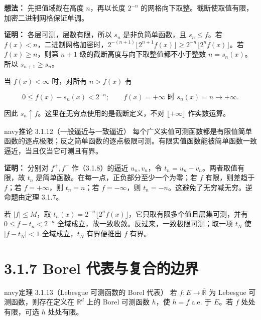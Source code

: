 \documentclass[11pt,a4paper]{article}
\begin{document}
\textbf{想法：} 先把值域截在高度 \(n\)，再以长度 \(2^{-n}\)
的网格向下取整。截断使取值有限，加密二进制网格保证单调。

\textbf{证明：} 各层可测，层数有限，所以 \(s_n\) 是非负简单函数，且
\(s_n\le f\)。若
\(f(x)<n\)，二进制网格加密时，\(2^{-(n+1)}\lfloor2^{n+1}f(x)\rfloor\ge2^{-n}\lfloor2^nf(x)\rfloor\)。若
\(f(x)\ge n\)，则第 \(n+1\) 级的截断高度与向下取整值都不小于整数
\(n=s_n(x)\)。所以 \(s_{n+1}\ge s_n\)。

当 \(f(x)<\infty\) 时，对所有 \(n>f(x)\) 有

\begin{equation*}
0\le f(x)-s_n(x)<2^{-n};
\qquad f(x)=+\infty\text{ 时 }s_n(x)=n\to+\infty.
\tag{3.1.9}
\end{equation*}

因此 \(s_n\uparrow f\)。这里在无穷点使用的是截断定义，不对
\(\lfloor+\infty\rfloor\) 作实数运算。

\begin{sboxenv}{navy}{推论 3.1.12（一般逼近与一致逼近）}
每个广义实值可测函数都是有限值简单函数的逐点极限；反之简单函数的逐点极限可测。有限实值函数能被简单函数一致逼近，当且仅当它可测且有界。

\end{sboxenv}

\textbf{证明：} 分别对 \(f^+,f^-\) 作（3.1.8）的逼近 \(u_n,v_n\)，令
\(t_n=u_n-v_n\)。两者取值有限，故 \(t_n\)
是简单函数。在每一点，正负部分至少一个为零；若 \(f\) 有限，则差趋于
\(f\)；若 \(f=+\infty\)，则 \(t_n=n\)；若 \(f=-\infty\)，则
\(t_n=-n\)。这避免了无穷减无穷。逆命题由定理 3.1.7。

若 \(|f|\le M\)，取
\(t_n(x)=2^{-n}\lfloor2^nf(x)\rfloor\)，它只取有限多个值且层集可测，并有
\(0\le f-t_n<2^{-n}\) 全域成立，故一致收敛。反过来，一致极限可测；取一项
\(t_N\) 使 \(|f-t_N|<1\) 全域成立，\(t_N\) 有界便推出 \(f\) 有界。

\section[\S{}3.1.7 Borel
代表与复合的边界]{3.1.7 Borel
代表与复合的边界}\label{borel-ux4ee3ux8868ux4e0eux590dux5408ux7684ux8fb9ux754c}

\begin{sboxenv}{navy}{定理 3.1.13（Lebesgue 可测函数的 Borel 代表）}
若 \(f:E\to\overline{\mathbb R}\) 为 Lebesgue 可测函数，则存在定义在
\(\mathbb R^d\) 上的 Borel 可测函数 \(h\)，使 \(h=f\) a.e. 于 \(E\)。若
\(f\) 处处有限，可选 \(h\) 处处有限。

\end{sboxenv}
\end{document}
